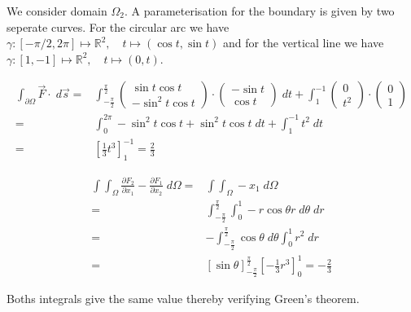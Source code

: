 \documentclass[11pt]{article}
\begin{document}
\begin{solution}
We consider domain $\Omega_2$. A parameterisation for the boundary is given by two seperate curves. For the circular arc we have $\gamma: [-\pi/2,2\pi] \mapsto \mathbb{R}^2, \quad t\mapsto  (\cos t, \sin t)$ and for the vertical line we have  $\gamma: [1,-1] \mapsto \mathbb{R}^2, \quad t\mapsto  (0, t)$. 

\begin{align*}
\int_{\partial \Omega} \vec{F} \cdot \;d\vec{s} =& \int_{-\frac{\pi}{2}}^ {\frac{\pi}{2}} \begin{pmatrix}\sin t \cos t\\ -\sin^2 t \cos t \end{pmatrix} \cdot \begin{pmatrix}-\sin t \\ \cos t \end{pmatrix} \; d t + \int_1^ {-1} \begin{pmatrix}0\\t^ 2\end{pmatrix}\cdot \begin{pmatrix}0\\1\end{pmatrix}\\
=& \int_0^{2\pi} -\sin^2 t\cos t + \sin^ 2 t \cos t \;dt + \int_{1}^ {-1} t^ 2 \;d t\\
=& \left[\frac{1}{3} t^ 3\right]_1^ {-1} = \frac{2}{3}
\end{align*}

\begin{align*}
\int \int_{\Omega} \frac{\partial F_2}{\partial x_1} - \frac{\partial F_1}{\partial x_2} \;d \Omega =& \int \int_{\Omega} -x_1 \; d\Omega\\
=& \int_{-\frac{\pi}{2}}^ {\frac{\pi}{2}} \int_0^1 -r\cos \theta r \;d\theta\;dr\\
=& -\int_{-\frac{\pi}{2}}^ {\frac{\pi}{2}} \cos \theta \;d \theta \int_0^1 r^ 2 \;d r\\
=& \left[\sin \theta\right]_{-\frac{\pi}{2}}^ {\frac{\pi}{2}} \left[-\frac{1}{3}r^ 3\right]_0^{1} = -\frac{2}{3}
\end{align*}

Boths integrals give the same value thereby verifying Green's theorem.\\

\end{solution}
\end{document}
